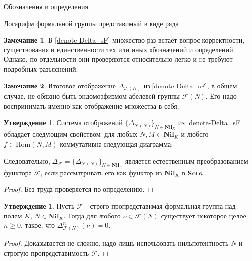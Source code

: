 \documentclass[a4paper,14pt]{extarticle}
\theoremstyle{definition}
\newtheorem{claim}[theorem]{Утверждение}
\newtheorem{remark}{Замечание}[section]
\newcommand{\Sets}{\mathbf{Sets}}
\newcommand{\Nil}[1]{\mathbf{Nil}_{#1}}
\newcommand{\Hom}[2]{\mathrm{Hom}\left(#1, #2\right)}
\newcommand{\sF}{\mathscr{F}}
\begin{document}
\begin{section}{Обозначения и определения}
\begin{subsection}{Логарифм формальной группы представимый в виде ряда}
\begin{remark}
   В \ref{denote-Delta_sF} множество раз встаёт вопрос корректности, существования и единственности тех или иных обозначений и определений. Однако, по отдельности они проверяются относительно легко и не требуют подробных разъяснений.
\end{remark}

\begin{remark}
   Итоговое отображение ${ \Delta_{\sF(N)} }$ из \ref{denote-Delta_sF}, в общем случае, не обязано быть эндоморфизмом абелевой группы $\sF(N)$. Его надо воспринимать именно как отображение множества в себя.
\end{remark}

\begin{claim}\label{claim-Delta_sF_property}
    Система отображений ${ \{\Delta_{\sF(N)}\}_{N \in \Nil{K}} }$ из \ref{denote-Delta_sF} обладает следующим свойством: для любых ${ N, M \in \Nil{K} }$ и любого ${ f \in \Hom{N}{M} }$ коммутативна следующая диаграмма:

    \begin{center}
    \end{center}
    
    Следовательно, ${ \Delta_\sF = \{\Delta_{\sF(N)}\}_{N \in \Nil{K}} }$ является естественным преобразованием функтора $\sF$, если рассматривать его как функтор из $\Nil{K}$ в $\Sets$.
\end{claim}
\begin{proof}
    Без труда проверяется по определению.
\end{proof}

\begin{claim}\label{claim-Delta_sF_property2}
    Пусть $\sF$ - строго пропредставимая формальная группа над полем $K$, ${ N \in \Nil{K} }$. Тогда для любого ${ \nu \in \sF(N) }$ существует некоторое целое ${ n \geq 0 }$, такое, что ${ \Delta_{\sF(N)}^n(\nu) = 0 }$.
\end{claim}
\begin{proof}
    Доказывается не сложно, надо лишь использовать нильпотентность $N$ и строгую пропредставимость $\sF$.
\end{proof}


\end{subsection}
\end{section}
\end{document}
